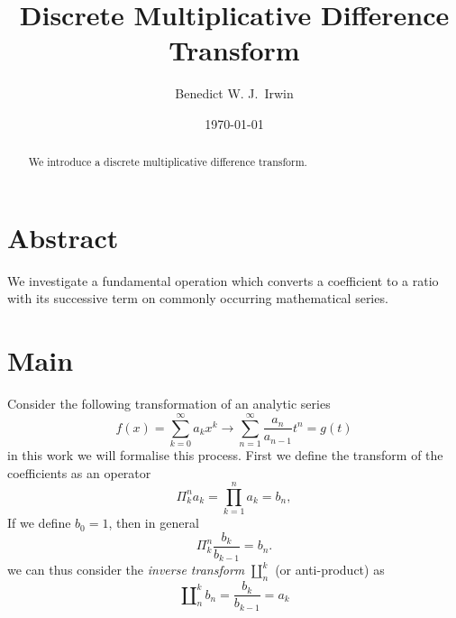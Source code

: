 \documentclass{article}
\title{Discrete Multiplicative Difference Transform}
\date{\today}
\begin{document}

\author[1,2]{Benedict W. J.~Irwin}


\maketitle
\begin{abstract}
We introduce a discrete multiplicative difference transform.
\end{abstract}

\section{Abstract}
We investigate a fundamental operation which converts a coefficient to a ratio with its successive term on commonly occurring mathematical series.

\section{Main}
Consider the following transformation of an analytic series
\begin{equation}
f(x)  = \sum_{k=0}^\infty a_k x^k \to \sum_{n=1}^\infty \frac{a_n}{a_{n-1}}t^n = g(t)
\end{equation}
in this work we will formalise this process. First we define the transform of the coefficients as an operator
\begin{equation}
\Pi_k^n a_k = \prod_{k=1}^n a_k = b_n,
\end{equation}
If we define $b_0=1$, then in general
\begin{equation}
\Pi_k^n \frac{b_k}{b_{k-1}} = b_n.
\end{equation}
we can thus consider the \emph{inverse transform} $\amalg_n^k$ (or anti-product) as
\begin{equation}
\amalg_n^k b_n = \frac{b_k}{b_{k-1}} = a_k
\end{equation}
\end{document}
